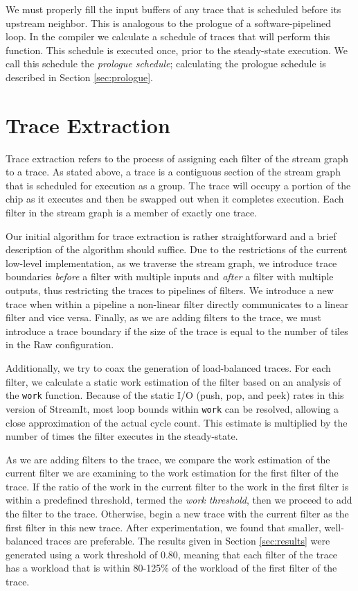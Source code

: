 We must properly fill the input buffers of any trace that is scheduled
before its upstream neighbor.  This is analogous to the prologue of a
software-pipelined loop.  In the compiler we calculate a schedule of
traces that will perform this function.  This schedule is executed
once, prior to the steady-state execution.  We call this schedule the
{\it prologue schedule}; calculating the prologue schedule is
described in Section \ref{sec:prologue}.

\section{Trace Extraction}
\label{sec:extraction}	
Trace extraction refers to the process of assigning each filter of the
stream graph to a trace.  As stated above, a trace is a contiguous
section of the stream graph that is scheduled for execution as a
group. The trace will occupy a portion of the chip as it executes and
then be swapped out when it completes execution.  Each filter in the
stream graph is a member of exactly one trace.

Our initial algorithm for trace extraction is rather straightforward
and a brief description of the algorithm should suffice.  Due to the
restrictions of the current low-level implementation, as we traverse
the stream graph, we introduce trace boundaries {\it before} a filter
with multiple inputs and {\it after} a filter with multiple outputs,
thus restricting the traces to pipelines of filters. We introduce a
new trace when within a pipeline a non-linear filter directly
communicates to a linear filter and vice versa. Finally, as we are
adding filters to the trace, we must introduce a trace boundary if the
size of the trace is equal to the number of tiles in the Raw
configuration.


Additionally, we try to coax the generation of load-balanced traces.
For each filter, we calculate a static work estimation of the filter
based on an analysis of the {\tt work} function.  Because of the
static I/O (push, pop, and peek) rates in this version of StreamIt,
most loop bounds within {\tt work} can be resolved, allowing a close
approximation of the actual cycle count.  This estimate is multiplied
by the number of times the filter executes in the steady-state.

As we are adding filters to the trace, we compare the work estimation
of the current filter we are examining to the work estimation for the
first filter of the trace.  If the ratio of the work in the current
filter to the work in the first filter is within a predefined
threshold, termed the {\it work threshold}, then we proceed to add the
filter to the trace.  Otherwise, begin a new trace with the current
filter as the first filter in this new trace.  After experimentation,
we found that smaller, well-balanced traces are preferable.  The
results given in Section \ref{sec:results} were generated using a work
threshold of 0.80, meaning that each filter of the trace has a
workload that is within 80-125\% of the workload of the first filter
of the trace.

